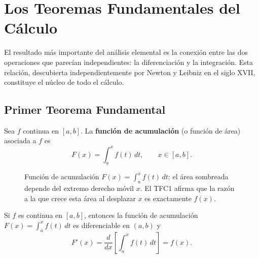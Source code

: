 \section{Los Teoremas Fundamentales del Cálculo}

El resultado más importante del análisis elemental es la conexión entre las dos operaciones que parecían independientes: la diferenciación y la integración. Esta relación, descubierta independientemente por Newton y Leibniz en el siglo XVII, constituye el núcleo de todo el cálculo.

\subsection{Primer Teorema Fundamental}

\begin{definition}
Sea $f$ continua en $[a,b]$. La \textbf{función de acumulación} (o función de área) asociada a $f$ es
\[
F(x) = \int_{a}^{x} f(t)\,dt, \qquad x \in [a,b].
\]
\end{definition}

\begin{figure}[!htbp]
\centering
{}
\caption{Función de acumulación $F(x)=\int_a^x f(t)\,dt$: el área sombreada
depende del extremo derecho móvil $x$. El TFC1 afirma que la razón a la que
crece esta área al desplazar $x$ es exactamente $f(x)$.}
\label{fig:funcion_acumulacion}
\end{figure}

\begin{theorem}
Si $f$ es continua en $[a,b]$, entonces la función de acumulación $F(x) = \int_{a}^{x} f(t)\,dt$ es diferenciable en $(a,b)$ y
\[
F'(x) = \frac{d}{dx}\left[\int_{a}^{x} f(t)\,dt\right] = f(x).
\]
\end{theorem}

